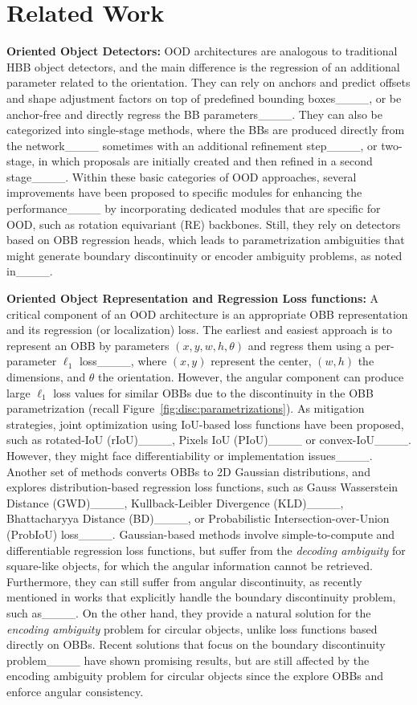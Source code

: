 \section{Related Work}
\noindent
\textbf{Oriented Object Detectors:} OOD architectures are analogous to traditional HBB object detectors, and the main difference is the regression of an additional parameter related to the orientation. They can rely on anchors and predict offsets and shape adjustment factors on top of predefined bounding boxes____, or be anchor-free and directly regress the BB parameters____. They can also be categorized into single-stage methods, where the BBs are produced directly from the network____ sometimes with an additional refinement step____, or two-stage, in which proposals are initially created and then refined in a second stage____. Within these basic categories of OOD approaches, several improvements have been proposed to specific modules for enhancing the performance____ by incorporating dedicated modules that are specific for OOD, such as rotation equivariant (RE) backbones. Still, they rely on detectors based on OBB regression heads, which leads to parametrization ambiguities that might generate boundary discontinuity or encoder ambiguity problems, as noted in____. 

\noindent
\textbf{Oriented Object Representation and Regression Loss functions:}
A critical component of an OOD architecture is an appropriate OBB representation and its regression (or localization) loss. The earliest and easiest approach is to represent an OBB by parameters $(x,y,w,h, \theta)$ and regress them using a per-parameter $\ell_1$ loss____, where $(x,y)$ represent the center, $(w,h)$ the dimensions, and $\theta$ the orientation. However, the angular component can produce large $\ell_1$ loss values for similar OBBs due to the discontinuity in the OBB parametrization (recall Figure~\ref{fig:disc:parametrizations}). As mitigation strategies, joint optimization using  IoU-based loss functions have been proposed, such as rotated-IoU (rIoU)____, Pixels IoU (PIoU)____ or convex-IoU____. However, they might face differentiability or implementation issues____. Another set of methods converts OBBs to 2D Gaussian distributions, and explores distribution-based regression loss functions, such as Gauss Wasserstein Distance (GWD)____, Kullback-Leibler Divergence (KLD)____, Bhattacharyya Distance (BD)____, or Probabilistic Intersection-over-Union (ProbIoU) loss____. Gaussian-based methods involve simple-to-compute and differentiable regression loss functions, but suffer from the \textit{decoding ambiguity} for square-like objects, for which the angular information cannot be retrieved. Furthermore, they can still suffer from angular discontinuity, as recently mentioned in works that explicitly handle the boundary discontinuity problem, such as____. On the other hand, they provide a natural solution for the \textit{encoding ambiguity} problem for circular objects, unlike loss functions based directly on OBBs. Recent solutions that focus on the boundary discontinuity problem____ have shown promising results, but are still affected by the encoding ambiguity problem for circular objects since the explore OBBs and enforce angular consistency.

